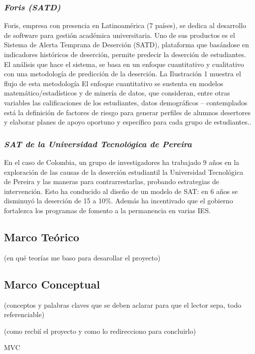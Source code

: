   \subsubsection{\textit{Foris (SATD)}}
  Foris, empresa con presencia en Latinoamérica (7 países), se dedica al desarrollo de software para gestión académica universitaria. Uno de sus productos es el Sistema de Alerta Temprana de Deserción (SATD), plataforma que basándose en indicadores históricos de deserción, permite predecir la deserción de estudiantes. El análisis que hace el sistema, se basa en un enfoque cuantitativo y cualitativo con una metodología de predicción de la deserción. La Ilustración 1 muestra el flujo de
  esta metodología
  El enfoque cuantitativo se sustenta en modelos matemático/estadísticos y de minería de datos, que consideran, entre otras variables las calificaciones de los estudiantes, datos demográficos – contemplados está la definición de factores de riesgo para generar perfiles de alumnos desertores y elaborar planes de apoyo oportuno y específico para cada grupo de estudiantes.\cite{SATPaper}.
 
   \subsubsection{\textit{SAT de la Universidad Tecnológica de Pereira}}
 En el caso de Colombia, un grupo de investigadores ha trabajado 9 años en la exploración de las causas de la deserción estudiantil la Universidad Tecnológica de Pereira y las maneras para contrarrestarlas, probando estrategias de intervención. Esto ha conducido al diseño de un modelo de SAT: en 6 años se disminuyó la deserción de 15 a 10\%. Además ha incentivado que el gobierno fortalezca los programas de fomento a la permanencia en varias IES. \cite{carvajal}
 
\subsection{Marco Teórico}
(en qué teorías me baso para desarollar el proyecto)
\subsection{Marco Conceptual}

(conceptos y palabras claves que se deben aclarar para que el lector sepa, todo referenciable)

(como recbií el proyecto y como lo redirecciono para concluirlo)

MVC 

